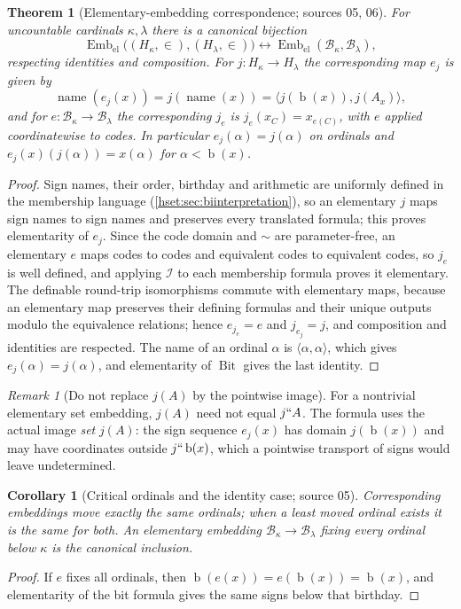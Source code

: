 \documentclass[11pt,letterpaper]{article}
\newtheorem{theorem}{Theorem}[section]
\newtheorem{corollary}[corollary]{Corollary}\aliascntresetthe{corollary}
\theoremstyle{definition}
\theoremstyle{remark}
\newtheorem{remark}[remark]{Remark}\aliascntresetthe{remark}
\newcommand{\bd}{\operatorname{b}}
\newcommand{\B}{\mathcal B}
\newcommand{\I}{\mathcal I}
\newcommand{\Bit}{\operatorname{Bit}}
\newcommand{\Emb}{\operatorname{Emb}_{\mathrm{el}}}
\newcommand{\name}{\operatorname{name}}
\begin{document}
\begin{theorem}[Elementary-embedding correspondence; sources 05, 06]
\label{hset:thm:embeddings}
For uncountable cardinals $\kappa,\lambda$ there is a canonical bijection
\[
 \Emb\bigl((H_\kappa,\in),(H_\lambda,\in)\bigr)
 \longleftrightarrow
 \Emb(\B_\kappa,\B_\lambda),
\]
respecting identities and composition. For $j:H_\kappa\to H_\lambda$ the
corresponding map $e_j$ is given by
\[
 \name(e_j(x))=j(\name(x))=\langle j(\bd(x)),j(A_x)\rangle,
\]
and for $e:\B_\kappa\to\B_\lambda$ the corresponding $j_e$ is
$j_e(x_C)=x_{e(C)}$, with $e$ applied coordinatewise to codes. In particular
$e_j(\alpha)=j(\alpha)$ on ordinals and $e_j(x)(j(\alpha))=x(\alpha)$ for
$\alpha<\bd(x)$.
\end{theorem}
\begin{proof}
Sign names, their order, birthday and arithmetic are uniformly defined in the
membership language (\cref{hset:sec:biinterpretation}), so an elementary $j$
maps sign names to sign names and preserves every translated formula; this
proves elementarity of $e_j$. Since the code domain and $\sim$ are
parameter-free, an elementary $e$ maps codes to codes and equivalent codes to
equivalent codes, so $j_e$ is well defined, and applying $\I$ to each
membership formula proves it elementary. The definable round-trip isomorphisms
commute with elementary maps, because an elementary map preserves their
defining formulas and their unique outputs modulo the equivalence relations;
hence $e_{j_e}=e$ and $j_{e_j}=j$, and composition and identities are
respected. The name of an ordinal $\alpha$ is $\langle\alpha,\alpha\rangle$,
which gives $e_j(\alpha)=j(\alpha)$, and elementarity of $\Bit$ gives the last
identity.
\end{proof}

\begin{remark}[Do not replace $j(A)$ by the pointwise image]
For a nontrivial elementary set embedding, $j(A)$ need not equal
$j``A$. The formula uses the actual image \emph{set} $j(A)$: the sign sequence
$e_j(x)$ has domain $j(\bd(x))$ and may have coordinates outside $j``\bd(x)$,
which a pointwise transport of signs would leave undetermined.
\end{remark}

\begin{corollary}[Critical ordinals and the identity case; source 05]
\label{hset:cor:critical}
Corresponding embeddings move exactly the same ordinals; when a least moved
ordinal exists it is the same for both. An elementary embedding
$\B_\kappa\to\B_\lambda$ fixing every ordinal below $\kappa$ is the canonical
inclusion.
\end{corollary}
\begin{proof}
If $e$ fixes all ordinals, then $\bd(e(x))=e(\bd(x))=\bd(x)$, and elementarity
of the bit formula gives the same signs below that birthday.
\end{proof}
\end{document}
